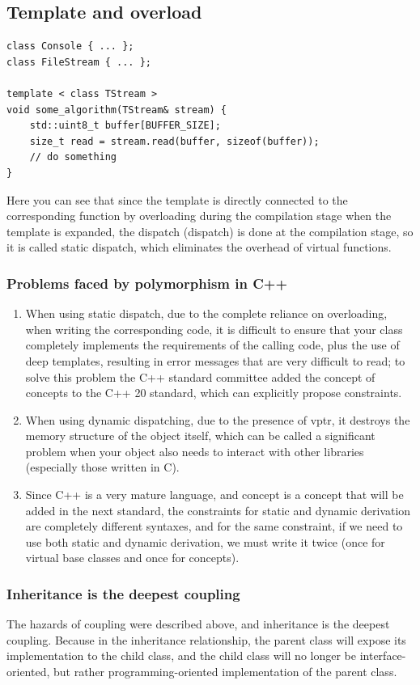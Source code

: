 \documentclass[a4paper]{exam}
\theoremstyle{definition}
\begin{document}
\subsection{Template and overload}

\begin{verbatim}
class Console { ... };
class FileStream { ... };

template < class TStream >
void some_algorithm(TStream& stream) {
    std::uint8_t buffer[BUFFER_SIZE];
    size_t read = stream.read(buffer, sizeof(buffer));
    // do something
}
\end{verbatim}
Here you can see that since the template is directly connected to the corresponding function by overloading during the compilation stage when the template is expanded, the dispatch (dispatch) is done at the compilation stage, so it is called static dispatch, which eliminates the overhead of virtual functions.

\subsubsection{Problems faced by polymorphism in C++}
\begin{enumerate}
\item When using static dispatch, due to the complete reliance on overloading, when writing the corresponding code, it is difficult to ensure that your class completely implements the requirements of the calling code, plus the use of deep templates, resulting in error messages that are very difficult to read; to solve this problem the C++ standard committee added the concept of concepts to the C++ 20 standard, which can explicitly propose constraints\cite{cppref}.
\item When using dynamic dispatching, due to the presence of vptr, it destroys the memory structure of the object itself, which can be called a significant problem when your object also needs to interact with other libraries (especially those written in C).
\item Since C++ is a very mature language, and concept is a concept that will be added in the next standard, the constraints for static and dynamic derivation are completely different syntaxes, and for the same constraint, if we need to use both static and dynamic derivation, we must write it twice (once for virtual base classes and once for concepts).
\end{enumerate}

\subsubsection{Inheritance is the deepest coupling}
The hazards of coupling were described above, and inheritance is the deepest coupling. Because in the inheritance relationship, the parent class will expose its implementation to the child class, and the child class will no longer be interface-oriented, but rather programming-oriented implementation of the parent class.
\end{document}
